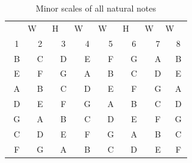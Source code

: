 \begin{table}[h]
	\centering
	\begin{tabular}{*{16}{c}}
		& \multicolumn{2}{P{4mm}}{\large{W}} & \multicolumn{2}{P{4mm}}{\large{H}} & \multicolumn{2}{P{4mm}}{\large{W}} & \multicolumn{2}{P{4mm}}{\large{W}} & \multicolumn{2}{P{4mm}}{\large{H}} & \multicolumn{2}{P{4mm}}{\large{W}} & \multicolumn{2}{P{4mm}}{\large{W}} & \\
		\multicolumn{2}{P{4mm}}{1} & \multicolumn{2}{P{4mm}}{2} & \multicolumn{2}{P{4mm}}{3} & \multicolumn{2}{P{4mm}}{4} & \multicolumn{2}{P{4mm}}{5} & \multicolumn{2}{P{4mm}}{6} & \multicolumn{2}{P{4mm}}{7} & \multicolumn{2}{P{4mm}}{8} \\
		\multicolumn{2}{P{4mm}}{B} & \multicolumn{2}{P{4mm}}{C\sharp} & \multicolumn{2}{P{4mm}}{D} & \multicolumn{2}{P{4mm}}{E} & \multicolumn{2}{P{4mm}}{F\sharp} & \multicolumn{2}{P{4mm}}{G} & \multicolumn{2}{P{4mm}}{A} & \multicolumn{2}{P{4mm}}{B} \\
		\multicolumn{2}{P{4mm}}{E} & \multicolumn{2}{P{4mm}}{F\sharp} & \multicolumn{2}{P{4mm}}{G} & \multicolumn{2}{P{4mm}}{A} & \multicolumn{2}{P{4mm}}{B} & \multicolumn{2}{P{4mm}}{C} & \multicolumn{2}{P{4mm}}{D} & \multicolumn{2}{P{4mm}}{E} \\
		\multicolumn{2}{P{4mm}}{A} & \multicolumn{2}{P{4mm}}{B} & \multicolumn{2}{P{4mm}}{C} & \multicolumn{2}{P{4mm}}{D} & \multicolumn{2}{P{4mm}}{E} & \multicolumn{2}{P{4mm}}{F} & \multicolumn{2}{P{4mm}}{G} & \multicolumn{2}{P{4mm}}{A} \\
		\multicolumn{2}{P{4mm}}{D} & \multicolumn{2}{P{4mm}}{E} & \multicolumn{2}{P{4mm}}{F} & \multicolumn{2}{P{4mm}}{G} & \multicolumn{2}{P{4mm}}{A} & \multicolumn{2}{P{4mm}}{B\flat} & \multicolumn{2}{P{4mm}}{C} & \multicolumn{2}{P{4mm}}{D} \\
		\multicolumn{2}{P{4mm}}{G} & \multicolumn{2}{P{4mm}}{A} & \multicolumn{2}{P{4mm}}{B\flat} & \multicolumn{2}{P{4mm}}{C} & \multicolumn{2}{P{4mm}}{D} & \multicolumn{2}{P{4mm}}{E\flat} & \multicolumn{2}{P{4mm}}{F} & \multicolumn{2}{P{4mm}}{G} \\
		\multicolumn{2}{P{4mm}}{C} & \multicolumn{2}{P{4mm}}{D} & \multicolumn{2}{P{4mm}}{E\flat} & \multicolumn{2}{P{4mm}}{F} & \multicolumn{2}{P{4mm}}{G} & \multicolumn{2}{P{4mm}}{A\flat} & \multicolumn{2}{P{4mm}}{B\flat} & \multicolumn{2}{P{4mm}}{C} \\
		\multicolumn{2}{P{4mm}}{F} & \multicolumn{2}{P{4mm}}{G} & \multicolumn{2}{P{4mm}}{A\flat} & \multicolumn{2}{P{4mm}}{B\flat} & \multicolumn{2}{P{4mm}}{C} & \multicolumn{2}{P{4mm}}{D\flat} & \multicolumn{2}{P{4mm}}{E\flat} & \multicolumn{2}{P{4mm}}{F}
	\end{tabular}
	\caption{Minor scales of all natural notes}
	\label{tab:guitar_natural_note_minor_scale}
\end{table}

